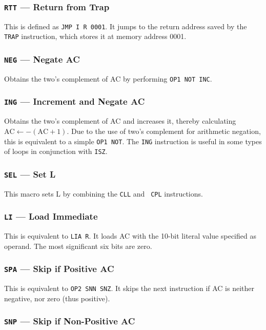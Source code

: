 \documentclass[11pt,a4paper,twocolumns]{article}
\newcommand\op[1]{\texttt{#1}}
\newcommand\hex[1]{\textsf{#1}}
\newcommand\register[1]{\textsf{#1}}
\newcommand\A{\register{AC}}
\newcommand\Lreg{\register{L}}
\begin{document}
\subsubsection{{\tt RTT} — Return from Trap} 

This is defined as {\tt JMP I R 0001}. It jumps to the return address
saved by the {\tt TRAP} instruction, which stores it at memory address
\hex{0001}.

\subsubsection{{\tt NEG} — Negate \A}

Obtains the two's complement of \A{} by performing {\tt OP1 NOT INC}.

\subsubsection{{\tt ING} — Increment and Negate \A}

Obtains the two's complement of \A{} and increases it, thereby
calculating $\mbox{AC} \leftarrow -(\mbox{AC} + 1)$. Due to the use of
two's complement for arithmetic negation, this is equivalent to a
simple {\tt OP1 NOT}. The {\op{ING}} instruction is useful in some
types of loops in conjunction with \op{ISZ}.

\subsubsection{{\tt SEL} — Set L}

This macro sets \Lreg{} by combining the {\tt CLL} and {\tt
  CPL} instructions.

\subsubsection{{\tt LI} — Load Immediate}

This is equivalent to {\tt LIA R}. It loads \A{} with the 10-bit literal
value specified as operand. The most significant six bits are zero.

\subsubsection{{\tt SPA} — Skip if Positive \A}

This is equivalent to {\tt OP2 SNN SNZ}. It skips the next instruction
if \A{} is neither negative, nor zero (thus positive).

\subsubsection{{\tt SNP} — Skip if Non-Positive \A}
\end{document}

